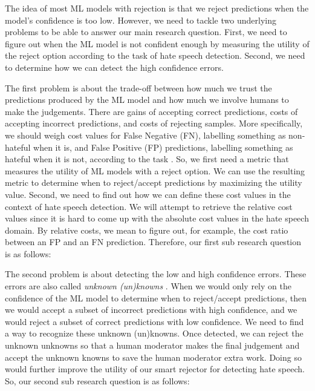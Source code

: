 The idea of most ML models with rejection is that we reject predictions when the model's confidence is too low. However, we need to tackle two underlying problems to be able to answer our main research question. First, we need to figure out when the ML model is not confident enough by measuring the utility of the reject option according to the task of hate speech detection. Second, we need to determine how we can detect the high confidence errors.

The first problem is about the trade-off between how much we trust the predictions produced by the ML model and how much we involve humans to make the judgements. There are gains of accepting correct predictions, costs of accepting incorrect predictions, and costs of rejecting samples. More specifically, we should weigh cost values for False Negative (FN), labelling something as non-hateful when it is, and False Positive (FP) predictions, labelling something as hateful when it is not, according to the task \cite{sayin2021science}. So, we first need a metric that measures the utility of ML models with a reject option. We can use the resulting metric to determine when to reject/accept predictions by maximizing the utility value. Second, we need to find out how we can define these cost values in the context of hate speech detection. We will attempt to retrieve the relative cost values since it is hard to come up with the absolute cost values in the hate speech domain. By relative costs, we mean to figure out, for example, the cost ratio between an FP and an FN prediction. Therefore, our first sub research question is as follows:


The second problem is about detecting the low and high confidence errors. These errors are also called \textit{unknown (un)knowns} \cite{liu2020towards}. When we would only rely on the confidence of the ML model to determine when to reject/accept predictions, then we would accept a subset of incorrect predictions with high confidence, and we would reject a subset of correct predictions with low confidence. We need to find a way to recognize these unknown (un)knowns. Once detected, we can reject the unknown unknowns so that a human moderator makes the final judgement and accept the unknown knowns to save the human moderator extra work. Doing so would further improve the utility of our smart rejector for detecting hate speech. So, our second sub research question is as follows:

